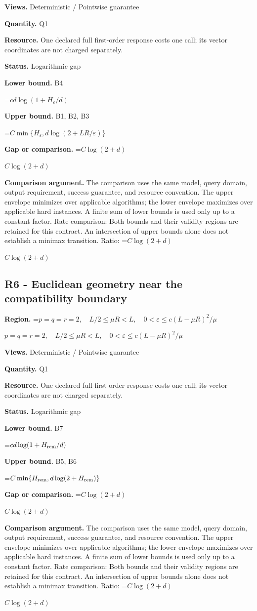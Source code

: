 \documentclass[10pt,a4paper]{article}
\newcommand{\AtlasMath}[1]{\par\begingroup\centering\setbox0=\hbox{$\displaystyle #1$}\ifdim\wd0>1.4\linewidth\typeout{ATLAS WIDE FORMULA: \the\wd0}\fi\ifdim\wd0>\linewidth\resizebox{\linewidth}{!}{\box0}\else\box0\fi\par\endgroup}
\newcommand{\AtlasInlineMath}[1]{\begingroup\setbox0=\hbox{$#1$}\ifdim\wd0>.4\linewidth\endgroup\AtlasMath{#1}\else\endgroup$#1$\fi}
\begin{document}
\textbf{Views.} Deterministic / Pointwise guarantee

\textbf{Quantity.} Q1

\textbf{Resource.} One declared full first-order response costs one call; its vector coordinates are not charged separately.

\textbf{Status.} Logarithmic gap

\textbf{Lower bound.} B4

\AtlasMath{cd\log(1+H_\varepsilon/d)}
\textbf{Upper bound.} B1, B2, B3

\AtlasMath{C\min\{H_\varepsilon,d\log(2+LR/\varepsilon)\}}
\textbf{Gap or comparison.} \AtlasInlineMath{C\log(2+d)}

\textbf{Comparison argument.} The comparison uses the same model, query domain, output requirement, success guarantee, and resource convention. The upper envelope minimizes over applicable algorithms; the lower envelope maximizes over applicable hard instances. A finite sum of lower bounds is used only up to a constant factor. Rate comparison: Both bounds and their validity regions are retained for this contract. An intersection of upper bounds alone does not establish a minimax transition. Ratio: \AtlasInlineMath{C\log(2+d)}

\subsection{R6 - Euclidean geometry near the compatibility boundary}
\textbf{Region.} \AtlasInlineMath{p=q=r=2,\quad L/2\le\mu R<L,\quad0<\varepsilon\le c(L-\mu R)^2/\mu}

\textbf{Views.} Deterministic / Pointwise guarantee

\textbf{Quantity.} Q1

\textbf{Resource.} One declared full first-order response costs one call; its vector coordinates are not charged separately.

\textbf{Status.} Logarithmic gap

\textbf{Lower bound.} B7

\AtlasMath{cd\log(1+H_{\rm rem}/d)}
\textbf{Upper bound.} B5, B6

\AtlasMath{C\min\{H_{\rm rem},d\log(2+H_{\rm rem})\}}
\textbf{Gap or comparison.} \AtlasInlineMath{C\log(2+d)}

\textbf{Comparison argument.} The comparison uses the same model, query domain, output requirement, success guarantee, and resource convention. The upper envelope minimizes over applicable algorithms; the lower envelope maximizes over applicable hard instances. A finite sum of lower bounds is used only up to a constant factor. Rate comparison: Both bounds and their validity regions are retained for this contract. An intersection of upper bounds alone does not establish a minimax transition. Ratio: \AtlasInlineMath{C\log(2+d)}
\end{document}
